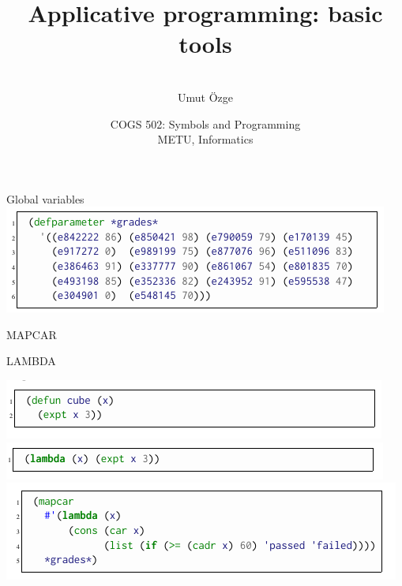 \documentclass[ignorenonframetext,10pt,aspectratio=169]{beamer}
\title{Applicative programming: basic tools}
\author{\  \\ \vspace{20pt} Umut \"Ozge\\  }
\date{COGS 502: Symbols and Programming \\ METU, Informatics}
\begin{document}
\begin{frame}\frametitle{}
\thispagestyle{empty}
\maketitle
\end{frame}

\begin{frame}[t,plain]{Global variables}
\vspace{10pt}
\includegraphics[scale=0.7]{img/defpar.png}

\end{frame}

\begin{frame}[t,plain]{MAPCAR}


\end{frame}

\begin{frame}[t,plain]{LAMBDA}

\includegraphics[scale=0.7]{img/defcube.png}
\pause
\includegraphics[scale=0.7]{img/lamcube.png}
\pause
\includegraphics[scale=0.7]{img/maplam.png}
\end{frame}
\end{document}
